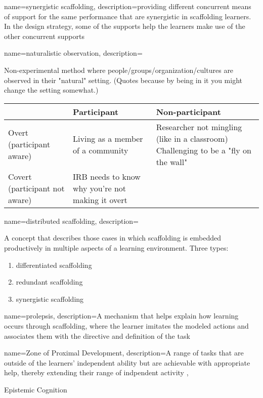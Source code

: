 {
	name={synergistic scaffolding},
	description={providing different concurrent means of support for the same performance that are synergistic in scaffolding learners. In the design strategy, some of the supports help the learners make use of the other concurrent supports }
}
{
	name={naturalistic observation},
	description={
Non-experimental method where people/groups/organization/cultures are observed in their "natural" setting. (Quotes because by being in it you might change the setting somewhat.)


\begin{tabular}{p{1in}|p{2in}|p{2in}}
& Participant & Non-participant \\ \hline
Overt (participant aware) & 
Living as a member of a community & 
Researcher not mingling (like in a classroom) 
Challenging to be a "fly on the wall"
\\ \hline
Covert (participant not aware) & 
IRB needs to know why you're not making it overt & 
\end{tabular}
}
}

{
	name={distributed scaffolding},
	description={A concept that describes those cases in which scaffolding is embedded productively in multiple aspects of a learning environment.  \parencite{reiser_scaffolding_2014} Three types:
	\begin{enumerate}
	\item \gls{differentiated scaffolding} 
	\item \gls{redundant scaffolding} 
	\item \gls{synergistic scaffolding}
	\end{enumerate}
	}
}

{
	name={prolepsis},
	description={A mechanism that helps explain how learning occurs through scaffolding, where the learner imitates the modeled actions and associates them with the directive and definition of the task \parencite{reiser_scaffolding_2014}}
}


{
	name={Zone of Proximal Development},
	description={A range of tasks that are outside of the learners' independent ability but are achievable with appropriate help, thereby extending their range of indpendent activity \parencite{reiser_scaffolding_2014}},
}



{Epistemic Cognition}

